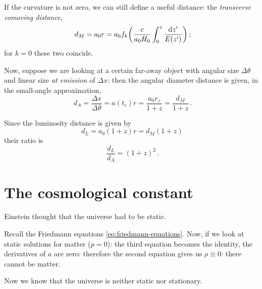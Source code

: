 \documentclass[main.tex]{subfiles}
\begin{document}
If the curvature is not zero, we can still define a useful distance: the \emph{transverse comoving distance}, 
%
\begin{align}
d_M = a_0 r = a_0 f_k \qty(\frac{c}{a_0 H_0 } \int_0^z \frac{\dd{z'}   }{E(z')})
\,;
\end{align}
%
for \(k=0\) these two coincide.



Now,  suppose we are looking at a certain far-away object with angular size \(\Delta \theta \) and linear size \emph{at emission} of \(\Delta x\): then the angular diameter distance is given, in the small-angle approximation,
%
\begin{equation}
d_A = \frac{ \Delta x}{\Delta \theta } = a(t_e) r
= \frac{a_0 r_z}{1+z} = \frac{d_M}{1+z}
\,.
\end{equation}

Since the luminosity distance is given by 
%
\begin{equation}
 d_L = a_0 (1+z) r = d_M (1+z)
\,
\end{equation}
%
their ratio is  
%
\begin{equation}
  \frac{d_L}{d_A} = (1+z)^2
\,.
\end{equation}



\section{The cosmological constant}

Einstein thought that the universe had to be static.

Recall the Friedmann equations \eqref{eq:friedmann-equations}. Now, if we look at static solutions for matter (\(p=0\)): the third equation becomes the identity, the derivatives of \(a\) are zero: therefore the second equation gives us \(\rho \equiv 0\): there cannot be matter.

Now we know that the universe is neither static nor stationary.
\end{document}
